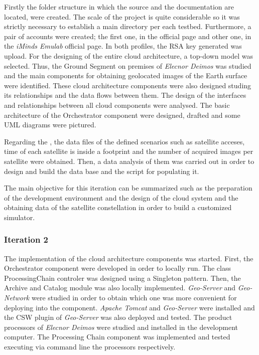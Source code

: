 Firstly the folder structure in which the source and the documentation are
located, were created. The scale of the project is quite considerable so it was
strictly necessary to establish a main directory per each testbed. Furthermore,
a pair of accounts were created; the first one, in the \bonfire official page
and other one, in the \emph{iMinds Emulab} official page. In both profiles, the
\ac{RSA} key generated was upload.
For the designing of the entire cloud architecture, a top-down model was
selected. Thus, the Ground Segment on premises of \emph{Elecnor Deimos} was
studied and the main components for obtaining geolocated images of the Earth
surface were identified. These cloud architecture components were also designed
studing its relationships and the data flows between them. The design of the
interfaces and relationships between all cloud components were analysed. 
The basic architecture of the Orchestrator component were
designed, drafted and some \ac{UML} diagrams were pictured. 

Regarding the \sss, the data files of the defined scenarios such as satellite acceses,
time of each satellite is inside a footprint and the number of acquired images per
satellite were obtained. Then, a data analysis of them was carried out in order
to design and build the data base and the script for populating it.


The main objective for this iteration can be summarized such as the preparation
of the development environment and the design of the cloud system and the
obtaining data of the satellite constellation in order to build a customized simulator.

\subsubsection{Iteration 2}

The implementation of the cloud architecture components was started. First, the
Orchestrator component were developed in order to locally run. The class
ProcessingChain controler was designed using a Singleton pattern. Then, the
Archive and Catalog module was also locally implemented. \emph{Geo-Server} and
\emph{Geo-Network} were studied in order to obtain which one was more convenient
for deploying into the component. \emph{Apache Tomcat} and \emph{Geo-Server}
were installed and the \ac{CSW} plugin of \emph{Geo-Server} was also deployed
and tested.
The product processors of \emph{Elecnor Deimos} were studied and installed in
the development computer. The Processing Chain component was implemented and
tested executing
via command line the processors respectively.

